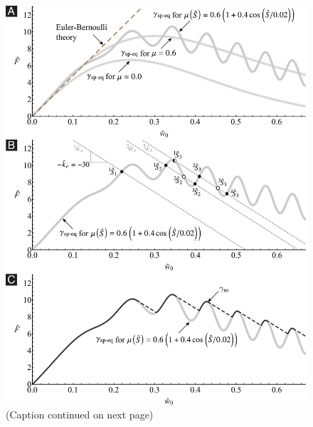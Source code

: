 \documentclass[preprint,10pt,times]{elsarticle}
\numberwithin{equation}{section}
\begin{document}
\begin{figure}
\centering{}
\includegraphics[width=1\textwidth]{../Figures_Submit/Model_V2.pdf}
\caption{(Caption continued on next page)}
\label{fig:NBSComparison}
\end{figure}
\end{document}

